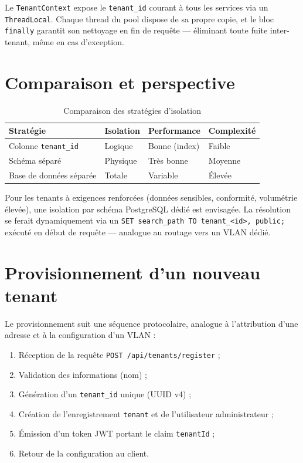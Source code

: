 \documentclass[12pt,a4paper]{report}
\theoremstyle{definition}
\theoremstyle{remark}
\newcommand{\jwt}{\textsc{JWT}}
\begin{document}
\begin{infobox}
	Le \texttt{TenantContext} expose le \texttt{tenant\_id} courant à tous les services via un \texttt{ThreadLocal}. Chaque thread du pool dispose de sa propre copie, et le bloc \texttt{finally} garantit son nettoyage en fin de requête — éliminant toute fuite inter-tenant, même en cas d'exception.
\end{infobox}

\section{Comparaison et perspective}

\begin{table}[h]
	\centering
	\caption{Comparaison des stratégies d'isolation}
	\label{tab:isolation}
	\begin{tabularx}{\textwidth}{lXXX}
		\toprule
		\textbf{Stratégie} & \textbf{Isolation} & \textbf{Performance} & \textbf{Complexité} \\
		\midrule
		Colonne \texttt{tenant\_id} & Logique & Bonne (index) & Faible \\
		Schéma séparé & Physique & Très bonne & Moyenne \\
		Base de données séparée & Totale & Variable & Élevée \\
		\bottomrule
	\end{tabularx}
\end{table}

Pour les tenants à exigences renforcées (données sensibles, conformité, volumétrie élevée), une isolation par schéma PostgreSQL dédié est envisagée. La résolution se ferait dynamiquement via un \texttt{SET search\_path TO tenant\_<id>, public;} exécuté en début de requête — analogue au routage vers un VLAN dédié.

\section{Provisionnement d'un nouveau tenant}

Le provisionnement suit une séquence protocolaire, analogue à l'attribution d'une adresse et à la configuration d'un VLAN :
\begin{enumerate}
	\item Réception de la requête \texttt{POST /api/tenants/register} ;
	\item Validation des informations (nom) ;
	\item Génération d'un \texttt{tenant\_id} unique (UUID v4) ;
	\item Création de l'enregistrement \texttt{tenant} et de l'utilisateur administrateur ;
	\item Émission d'un token \jwt{} portant le claim \texttt{tenantId} ;
	\item Retour de la configuration au client.
\end{enumerate}
\end{document}
